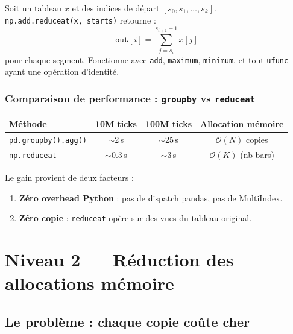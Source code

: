 \documentclass[11pt, a4paper]{article}
\begin{document}
\begin{keybox}
Soit un tableau $x$ et des indices de d\'epart $[s_0, s_1, \ldots, s_k]$.\\
\texttt{np.add.reduceat(x, starts)} retourne :
\[
    \texttt{out}[i] = \sum_{j=s_i}^{s_{i+1}-1} x[j]
\]
pour chaque segment. Fonctionne avec \texttt{add}, \texttt{maximum}, \texttt{minimum},
et tout \texttt{ufunc} ayant une op\'eration d'identit\'e.
\end{keybox}

\subsubsection{Comparaison de performance : \texttt{groupby} vs \texttt{reduceat}}

\begin{center}
\begin{tabular}{lccc}
\toprule
\textbf{M\'ethode} & \textbf{10M ticks} & \textbf{100M ticks} & \textbf{Allocation m\'emoire} \\
\midrule
\texttt{pd.groupby().agg()} & $\sim$2\,s & $\sim$25\,s & $\mathcal{O}(N)$ copies \\
\texttt{np.reduceat} & $\sim$0.3\,s & $\sim$3\,s & $\mathcal{O}(K)$ (nb bars) \\
\bottomrule
\end{tabular}
\end{center}

Le gain provient de deux facteurs :
\begin{enumerate}
    \item \textbf{Z\'ero overhead Python} : pas de dispatch pandas, pas de MultiIndex.
    \item \textbf{Z\'ero copie} : \texttt{reduceat} op\`ere sur des vues du tableau original.
\end{enumerate}


\section{Niveau 2 --- R\'eduction des allocations m\'emoire}

\subsection{Le probl\`eme : chaque copie co\^ute cher}
\end{document}
